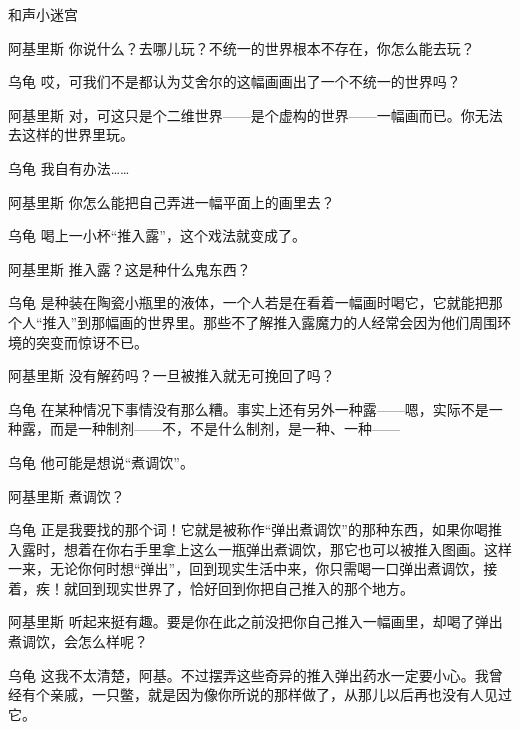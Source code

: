 \begin{dialog}{和声小迷宫}
\begin{dialogue}
\begin{dialogue}
  \item[阿基里斯]你说什么？去哪儿玩？不统一的世界根本不存在，你怎么能去玩？

  \item[乌龟]哎，可我们不是都认为艾舍尔的这幅画画出了一个不统一的世界吗？

  \item[阿基里斯]对，可这只是个二维世界——是个虚构的世界——一幅画而已。你无法去这样的世界里玩。

  \item[乌龟]我自有办法……

  \item[阿基里斯]你怎么能把自己弄进一幅平面上的画里去？

  \item[乌龟]喝上一小杯“推入露”，这个戏法就变成了。

  \item[阿基里斯]推入露？这是种什么鬼东西？

  \item[乌龟]是种装在陶瓷小瓶里的液体，一个人若是在看着一幅画时喝它，它就能把那个人“推入”到那幅画的世界里。那些不了解推入露魔力的人经常会因为他们周围环境的突变而惊讶不已。

  \item[阿基里斯]没有解药吗？一旦被推入就无可挽回了吗？

  \item[乌龟]在某种情况下事情没有那么糟。事实上还有另外一种露——嗯，实际不是一种露，而是一种制剂——不，不是什么制剂，是一种、一种——

  \end{dialogue}

\item[乌龟]他可能是想说“煮调饮”。

  \begin{dialogue}

  \item[阿基里斯]煮调饮？

  \item[乌龟]正是我要找的那个词！它就是被称作“弹出煮调饮”的那种东西，如果你喝推入露时，想着在你右手里拿上这么一瓶弹出煮调饮，那它也可以被推入图画。这样一来，无论你何时想“弹出”，回到现实生活中来，你只需喝一口弹出煮调饮，接着，疾！就回到现实世界了，恰好回到你把自己推入的那个地方。

  \item[阿基里斯]听起来挺有趣。要是你在此之前没把你自己推入一幅画里，却喝了弹出煮调饮，会怎么样呢？

  \item[乌龟]这我不太清楚，阿基。不过摆弄这些奇异的推入弹出药水一定要小心。我曾经有个亲戚，一只鳖，就是因为像你所说的那样做了，从那儿以后再也没有人见过它。


\end{dialogue}
\end{dialogue}
\end{dialog}
